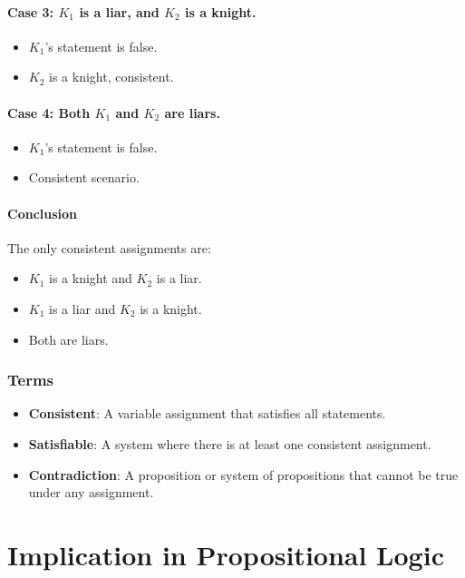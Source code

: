 \documentclass{article}
\begin{document}
\paragraph{Case 3: $K_1$ is a liar, and $K_2$ is a knight.}
\begin{itemize}
    \item $K_1$'s statement is false.
    \item $K_2$ is a knight, consistent.
\end{itemize}

\paragraph{Case 4: Both $K_1$ and $K_2$ are liars.}
\begin{itemize}
    \item $K_1$'s statement is false.
    \item Consistent scenario.
\end{itemize}

\paragraph{Conclusion}
The only consistent assignments are:
\begin{itemize}
    \item $K_1$ is a knight and $K_2$ is a liar.
    \item $K_1$ is a liar and $K_2$ is a knight.
    \item Both are liars.
\end{itemize}

\subsubsection{Terms}
\begin{itemize}
    \item \textbf{Consistent}: A variable assignment that satisfies all statements.
    \item \textbf{Satisfiable}: A system where there is at least one consistent assignment.
    \item \textbf{Contradiction}: A proposition or system of propositions that cannot be true under any assignment.
\end{itemize}

\section{Implication in Propositional Logic}
\end{document}
